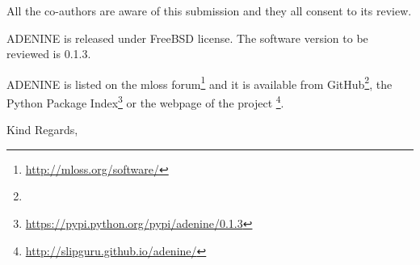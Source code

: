 \documentclass[11pt]{letter} %
\begin{document}
\begin{letter}
All the co-authors are aware of this submission and they all consent to its review.

%

{\sc ADENINE} is released under FreeBSD license. The software version to be reviewed is 0.1.3.

{\sc ADENINE} is listed on the mloss forum\footnote{\url{http://mloss.org/software/}} and it is available from GitHub\footnote{}, the Python Package Index\footnote{\url{https://pypi.python.org/pypi/adenine/0.1.3}} or the webpage of the project \footnote{\url{http://slipguru.github.io/adenine/}}.

\closing{Kind Regards,}




\end{letter}
\end{document}
